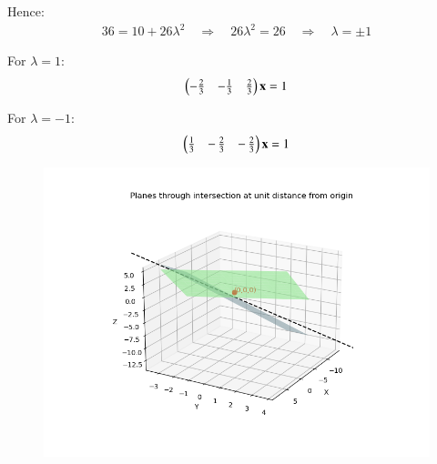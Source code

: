 \documentclass[journal]{article}
\begin{document}
Hence:
\begin{align}
36=10+26\lambda^2
\quad\Longrightarrow\quad
26\lambda^2=26
\quad\Longrightarrow\quad
\lambda=\pm1
\end{align}

For $\lambda=1$:
\begin{align}
\begin{pmatrix}-\tfrac{2}{3}&-\tfrac{1}{3}&\tfrac{2}{3}\end{pmatrix}\mathbf{x}=1
\end{align}

For $\lambda=-1$:
\begin{align}
\begin{pmatrix}\tfrac{1}{3}&-\,\tfrac{2}{3}&-\,\tfrac{2}{3}\end{pmatrix}\mathbf{x}=1
\end{align}
\newpage
\begin{figure}
    \centering
    \includegraphics[width=1.0\linewidth]{figs/Figure_1.png}
    \caption{}
    \label{fig:placeholder}
\end{figure}
\end{document}
